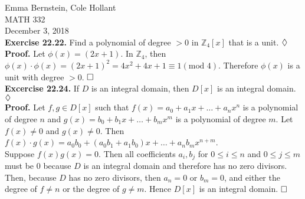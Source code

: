 \documentclass[12pt]{article}
\begin{document}
\noindent
Emma Bernstein, Cole Hollant\\
MATH 332\\
December 3, 2018\\
\textbf{Exercise 22.22.} Find a polynomial of degree $> 0$ in $\mathbb{Z}_4\left[x\right]$ that is a unit. $ \hfill \lozenge$\\
\textbf{Proof.} Let $\phi(x) = (2x+1)$. In $\mathbb{Z}_4$, then $\phi(x) \cdot \phi(x) = (2x+1)^2 = 4x^2 + 4x + 1 \equiv 1 (\text{mod } 4)$. Therefore $\phi(x)$ is a unit with degree $>0$. $ \hfill \square$\\
\textbf{Excercise 22.24.} If $D$ is an integral domain, then $D[x]$ is an integral domain. $ \hfill \lozenge$\\
\textbf{Proof.} Let $f,g \in D[x]$ such that $f(x)=a_0 + a_1 x + \ldots + a_n x^n$ is a polynomial of degree $n$ and $g(x)= b_0 + b_1 x + \ldots + b_mx^m$ is a polynomial of degree $m$. Let $f(x) \neq 0$ and $g(x) \neq 0$. Then $f(x) \cdot g(x) = a_0 b_0 + (a_0 b_1 + a_1 b_0)x + \ldots + a_n b_m x^{n+m}$.\\
\indent Suppose $f(x) g(x) = 0$. Then all coefficients $a_i, b_j$ for $0 \leq i \leq n$ and $0 \leq j \leq m$ must be 0 because $D$ is an integral domain and therefore has no zero divisors. Then, because $D$ has no zero divisors, then $a_n=0$ or $b_m=0$, and either the degree of $f\neq n$ or the degree of $g\neq m$. Hence $D[x]$ is an integral domain. $ \hfill \square$\\
\end{document}

